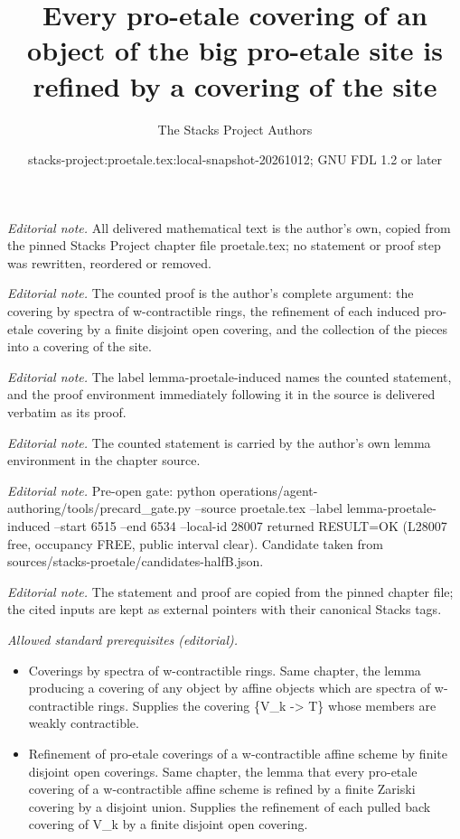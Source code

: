 \documentclass[10pt,a4paper]{amsart}
\title{Every pro-etale covering of an object of the big pro-etale site is refined by a covering of the site}
\author{The Stacks Project Authors}
\date{stacks-project:proetale.tex:local-snapshot-20261012; GNU FDL 1.2 or later}
\theoremstyle{plain}
\theoremstyle{definition}
\theoremstyle{remark}
\numberwithin{equation}{subsection}
\begin{document}
\maketitle
\noindent\textit{Editorial note.} All delivered mathematical text is the author's own, copied from the pinned Stacks Project chapter file proetale.tex; no statement or proof step was rewritten, reordered or removed.\par\medskip
\noindent\textit{Editorial note.} The counted proof is the author's complete argument: the covering by spectra of w-contractible rings, the refinement of each induced pro-etale covering by a finite disjoint open covering, and the collection of the pieces into a covering of the site.\par\medskip
\noindent\textit{Editorial note.} The label lemma-proetale-induced names the counted statement, and the proof environment immediately following it in the source is delivered verbatim as its proof.\par\medskip
\noindent\textit{Editorial note.} The counted statement is carried by the author's own lemma environment in the chapter source.\par\medskip
\noindent\textit{Editorial note.} Pre-open gate: python operations/agent-authoring/tools/precard\_gate.py --source proetale.tex --label lemma-proetale-induced --start 6515 --end 6534 --local-id 28007 returned RESULT=OK (L28007 free, occupancy FREE, public interval clear). Candidate taken from sources/stacks-proetale/candidates-halfB.json.\par\medskip
\noindent\textit{Editorial note.} The statement and proof are copied from the pinned chapter file; the cited inputs are kept as external pointers with their canonical Stacks tags.\par\medskip
\noindent\textit{Allowed standard prerequisites (editorial).}\begin{itemize}
\item Coverings by spectra of w-contractible rings. Same chapter, the lemma producing a covering of any object by affine objects which are spectra of w-contractible rings. Supplies the covering \{V\_k -> T\} whose members are weakly contractible.
\item Refinement of pro-etale coverings of a w-contractible affine scheme by finite disjoint open coverings. Same chapter, the lemma that every pro-etale covering of a w-contractible affine scheme is refined by a finite Zariski covering by a disjoint union. Supplies the refinement of each pulled back covering of V\_k by a finite disjoint open covering.
\end{itemize}\medskip
\end{document}
